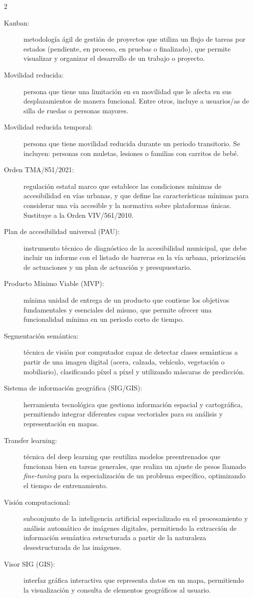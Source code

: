 \begin{multicols}{2}
\begin{description}
    \item[Kanban:] metodología ágil de gestión de proyectos que utiliza un flujo de tareas por estados (pendiente, en proceso, en pruebas o finalizado), que permite visualizar y organizar el desarrollo de un trabajo o proyecto.
    \item[Movilidad reducida:] persona que tiene una limitación en su movilidad que le afecta en sus desplazamientos de manera funcional. Entre otros, incluye a usuarios/as de silla de ruedas o personas mayores.
    \item[Movilidad reducida temporal:] persona que tiene movilidad reducida durante un periodo transitorio. Se incluyen: personas con muletas, lesiones o familias con carritos de bebé.
    \item[Orden TMA/851/2021:] regulación estatal marco que establece las condiciones mínimas de accesibilidad en vías urbanas, y que define las características mínimas para considerar una vía accesible y la normativa sobre plataformas únicas. Sustituye a la Orden VIV/561/2010.
    \item[Plan de accesibilidad universal (PAU):] instrumento técnico de diagnóstico de la accesibilidad municipal, que debe incluir un informe con el listado de barreras en la vía urbana, priorización de actuaciones y un plan de actuación y presupuestario.
    \item[Producto Mínimo Viable (MVP):] mínima unidad de entrega de un producto que contiene los objetivos fundamentales y esenciales del mismo, que permite ofrecer una funcionalidad mínima en un periodo corto de tiempo.
    \item[Segmentación semántica:] técnica de visión por computador capaz de detectar clases semánticas a partir de una imagen digital (acera, calzada, vehículo, vegetación o mobiliario), clasificando píxel a píxel y utilizando máscaras de predicción.
    \item[Sistema de información geográfica (SIG/GIS):] herramienta tecnológica que gestiona información espacial y cartográfica, permitiendo integrar diferentes capas vectoriales para su análisis y representación en mapas.
    \item[Transfer learning:] técnica del deep learning que reutiliza modelos preentrenados que funcionan bien en tareas generales, que realiza un ajuste de pesos llamado \textit{fine-tuning} para la especialización de un problema específico, optimizando el tiempo de entrenamiento.
    \item[Visión computacional:] subconjunto de la inteligencia artificial especializado en el procesamiento y análisis automático de imágenes digitales, permitiendo la extracción de información semántica estructurada a partir de la naturaleza desestructurada de las imágenes.
    \item[Visor SIG (GIS):] interfaz gráfica interactiva que representa datos en un mapa, permitiendo la visualización y consulta de elementos geográficos al usuario.
\end{description}
\end{multicols}